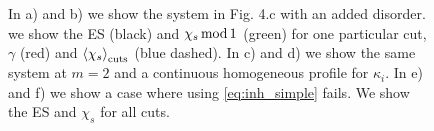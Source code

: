 \documentclass[twocolumn,amsmath,longbibliography,amssymb,superscriptaddress]{revtex4-1}
\begin{document}
\begin{figure}[h!]
\centering
{}\hspace{0mm}

\hspace{0mm}

\caption{In a) and b) we show the system in Fig. 4.c with an added disorder. we show the ES (black) and $ \chi_s \, {\rm mod} \, 1$ (green) for one particular cut,$\gamma$ (red) and $\expval{\chi_s}_{\rm cuts}$ (blue dashed). In c) and d) we show the same system at $m=2$ and a continuous homogeneous profile for $\kappa_i$. In e) and f) we show a case where using \eqref{eq:inh_simple} fails. We show the ES and $\chi_s$ for all cuts. }
\label{fig:simple_inh}
\end{figure}
\end{document}
